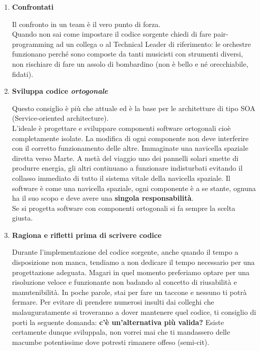 \begin{enumerate}
\item \textbf{Confrontati}

Il confronto in un team è il vero punto di forza. \\
Quando non sai come impostare il codice sorgente chiedi di fare pair-programming ad un collega o al Technical Leader di riferimento: le orchestre funzionano perché sono composte da tanti musicisti con strumenti diversi, non rischiare di fare un assolo di bombardino (non è bello e né orecchiabile, fidati).

\item \textbf{Sviluppa codice \emph{ortogonale}} 

Questo consiglio è più che attuale ed è la base per le architetture di tipo SOA (Service-oriented architecture). \\
L'ideale è progettare e sviluppare componenti software ortogonali cioè completamente isolate. La modifica di ogni componente non deve interferire con il corretto funzionamento delle altre. Immaginate una navicella spaziale diretta verso Marte. A metà del viaggio uno dei pannelli solari smette di produrre energia, gli altri continuano a funzionare indisturbati evitando il collasso immediato di tutto il sistema vitale della navicella spaziale. Il software è come una navicella spaziale, ogni componente è a se stante, ognuna ha il suo scopo e deve avere una \textbf{singola responsabilità}.\\
Se si progetta software con componenti ortogonali si fa sempre la scelta giusta.

\item \textbf{Ragiona e rifletti prima di scrivere codice}

Durante l'implementazione del codice sorgente, anche quando il tempo a disposizione non manca, tendiamo a non dedicare il tempo necessario per una progettazione adeguata. Magari in quel momento preferiamo optare per una risoluzione veloce e funzionante non badando al concetto di riusabilità e manutenibilità. In poche parole, stai per fare un taccone e nessuno ti potrà fermare. Per evitare di prendere numerosi insulti dai colleghi che malauguratamente si troveranno a dover mantenere quel codice, ti consiglio di porti la seguente domanda: \textbf{c'è un'alternativa più valida?} Esiste certamente dunque sviluppala, non vorrei mai che ti mandassero delle macumbe potentissime dove potresti rimanere offeso (semi-cit).


\end{enumerate}

